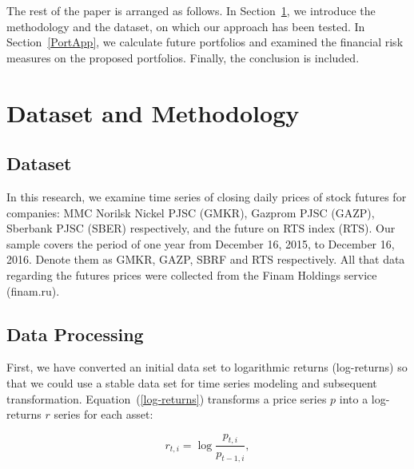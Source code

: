 \documentclass{llncs}
\begin{document}
The rest of the paper is arranged as follows. In Section~\ref{Methodology}, we introduce the methodology and
the dataset, on which our approach has been tested. %
In Section~\ref{PortApp}, we calculate future portfolios
and examined the financial risk measures on the proposed portfolios. 
Finally, the conclusion is included. 


\section{Dataset and Methodology}\label{Methodology}

\subsection{Dataset} 

In this research, we examine  time series of closing daily prices of stock futures for companies: MMC Norilsk Nickel PJSC (GMKR), Gazprom PJSC
(GAZP), Sberbank PJSC (SBER) respectively, and the future on RTS
index (RTS). Our sample covers the period of one year from December 16, 2015, to
December 16, 2016. Denote them as GMKR, GAZP, SBRF and RTS respectively. All that data regarding the futures prices were collected from the Finam Holdings service (finam.ru). %


\subsection{Data Processing}
First, we have converted an initial data set to logarithmic returns (log-returns) so that we could use a stable data set for time series modeling and subsequent transformation. Equation~(\ref{log-returns}) transforms a price series $p$ into a log-returns $r$ series for each asset:

\begin{equation}\label{log-returns}
r_{t,i}=\log \frac{p_{t,i}}{p_{t-1,i}},
\end{equation}
\end{document}
